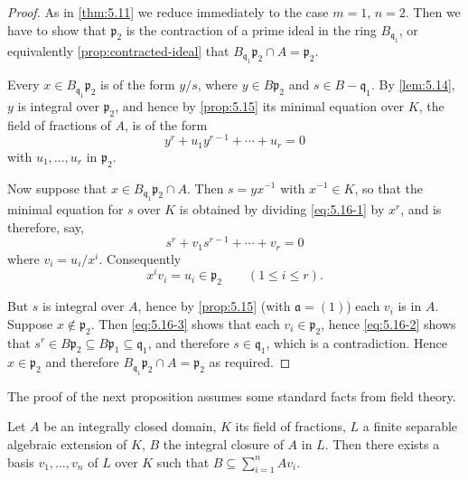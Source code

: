 \begin{proof}
    As in \eqref{thm:5.11} we reduce immediately to the case $m = 1$, $n = 2$. Then we have to show that $\mathfrak{p}_2$ is the contraction of a prime ideal in the ring $B_{\mathfrak{q}_1}$, or equivalently \eqref{prop:contracted-ideal} that $B_{\mathfrak{q}_1} \mathfrak{p}_2 \cap A = \mathfrak{p}_2$.

    Every $x \in B_{\mathfrak{q}_1} \mathfrak{p}_2$ is of the form $y/s$, where $y \in B \mathfrak{p}_2$ and $s \in B - \mathfrak{q}_1$. By \eqref{lem:5.14}, $y$ is integral over $\mathfrak{p}_2$, and hence by \eqref{prop:5.15} its minimal equation over $K$, the field of fractions of $A$, is of the form
    \begin{equation}\label{eq:5.16-1}
    y^r + u_1 y^{r-1} + \cdots + u_r = 0 \tag{1}
    \end{equation}
    with $u_1, \ldots, u_r$ in $\mathfrak{p}_2$.

    Now suppose that $x \in B_{\mathfrak{q}_1} \mathfrak{p}_2 \cap A$. Then $s = y x^{-1}$ with $x^{-1} \in K$, so that the minimal equation for $s$ over $K$ is obtained by dividing \eqref{eq:5.16-1} by $x^r$, and is therefore, say,
    \begin{equation}\label{eq:5.16-2}
    s^r + v_1 s^{r-1} + \cdots + v_r = 0 \tag{2}
    \end{equation}
    where $v_i = u_i / x^i$. Consequently
    \begin{equation}\label{eq:5.16-3}
    x^i v_i = u_i \in \mathfrak{p}_2 \qquad (1 \leq i \leq r) \tag{3}.
    \end{equation}

    But $s$ is integral over $A$, hence by \eqref{prop:5.15} (with $\mathfrak{a} = (1)$) each $v_i$ is in $A$. Suppose $x \notin \mathfrak{p}_2$. Then \eqref{eq:5.16-3} shows that each $v_i \in \mathfrak{p}_2$, hence \eqref{eq:5.16-2} shows that $s^r \in B \mathfrak{p}_2 \subseteq B \mathfrak{p}_1 \subseteq \mathfrak{q}_1$, and therefore $s \in \mathfrak{q}_1$, which is a contradiction. Hence $x \in \mathfrak{p}_2$ and therefore $B_{\mathfrak{q}_1} \mathfrak{p}_2 \cap A = \mathfrak{p}_2$ as required.
\end{proof}

The proof of the next proposition assumes some standard facts from field theory.

\begin{proposition}\label{prop:5.17}
    Let $A$ be an integrally closed domain, $K$ its field of fractions, $L$ a finite separable algebraic extension of $K$, $B$ the integral closure of $A$ in $L$. Then there exists a basis $v_1, \ldots, v_n$ of $L$ over $K$ such that $B \subseteq \sum_{i=1}^n A v_i$.
\end{proposition}

